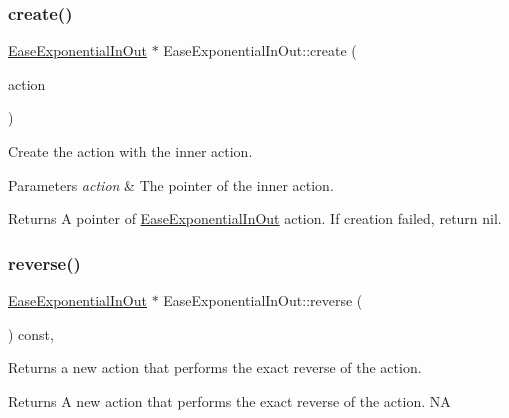 \subsubsection{\texorpdfstring{create()}{create()}}
{\footnotesize\ttfamily \hyperlink{classEaseExponentialInOut}{Ease\+Exponential\+In\+Out} $\ast$ Ease\+Exponential\+In\+Out\+::create (\begin{DoxyParamCaption}\item[{\hyperlink{classActionInterval}{Action\+Interval} $\ast$}]{action }\end{DoxyParamCaption})\hspace{0.3cm}{\ttfamily [static]}}



Create the action with the inner action. 


\begin{DoxyParams}{Parameters}
{\em action} & The pointer of the inner action. \\
\hline
\end{DoxyParams}
\begin{DoxyReturn}{Returns}
A pointer of \hyperlink{classEaseExponentialInOut}{Ease\+Exponential\+In\+Out} action. If creation failed, return nil. 
\end{DoxyReturn}
\mbox{\label{classEaseExponentialInOut_a48f34b3525dacd953bd9dbd014e93356}} 
\subsubsection{\texorpdfstring{reverse()}{reverse()}}
{\footnotesize\ttfamily \hyperlink{classEaseExponentialInOut}{Ease\+Exponential\+In\+Out} $\ast$ Ease\+Exponential\+In\+Out\+::reverse (\begin{DoxyParamCaption}\item[{void}]{ }\end{DoxyParamCaption}) const\hspace{0.3cm}{\ttfamily [override]}, {\ttfamily [virtual]}}

Returns a new action that performs the exact reverse of the action.

\begin{DoxyReturn}{Returns}
A new action that performs the exact reverse of the action.  NA 
\end{DoxyReturn}


